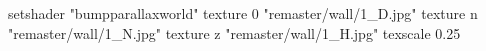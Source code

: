 setshader "bumpparallaxworld"
    texture 0 "remaster/wall/1_D.jpg"
    texture n "remaster/wall/1_N.jpg"
    texture z "remaster/wall/1_H.jpg"
    texscale 0.25